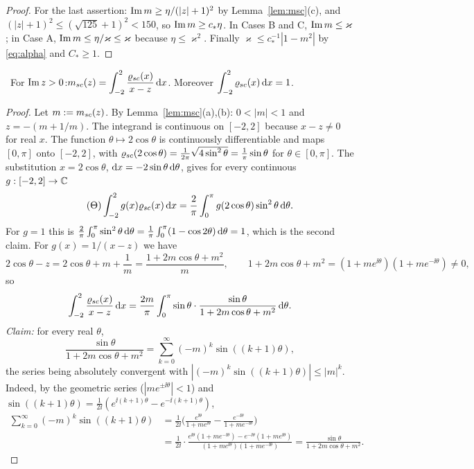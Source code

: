 \begin{proof}
For the last assertion: $\operatorname{Im} m\ge\eta/(|z|+1)^2$ by Lemma~\ref{lem:msc}(c), and $(|z|+1)^2\le(\sqrt{125}+1)^2<150$, so $\operatorname{Im} m\ge c_*\eta$. In Cases B and C, $\operatorname{Im} m\le\varkappa$; in Case A, $\operatorname{Im} m\le\eta/\varkappa\le\varkappa$ because $\eta\le\varkappa^2$.
Finally $\varkappa\le c_*^{-1}|1-m^2|$ by \eqref{eq:alpha} and $C_*\ge1$.
\end{proof}

\begin{lemma}\label{lem:stieltjes} \infra\
For $\operatorname{Im} z>0$:\quad $\displaystyle m_{sc}(z)=\int_{-2}^2\frac{\varrho_{sc}(x)}{x-z}\,\mathrm{d} x$. Moreover $\displaystyle\int_{-2}^2\varrho_{sc}(x)\,\mathrm{d} x=1$.
\end{lemma}
\begin{proof}
Let $m:=m_{sc}(z)$. By Lemma~\ref{lem:msc}(a),(b): $0<|m|<1$ and $z=-(m+1/m)$. The integrand is continuous on $[-2,2]$ because $x-z\ne0$ for real $x$.
The function $\theta\mapsto2\cos\theta$ is continuously differentiable and maps $[0,\pi]$ onto $[-2,2]$, with $\varrho_{sc}(2\cos\theta)=\frac1{2\pi}\sqrt{4\sin^2\theta}=\frac1\pi\sin\theta$ for $\theta\in[0,\pi]$.
The substitution $x=2\cos\theta$, $\mathrm{d} x=-2\sin\theta\,\mathrm{d}\theta$, gives for every continuous $g:[-2,2]\to\mathbb{C}$
\begin{equation}\tag{$\Theta$}\label{eq:a1-Theta}
 \int_{-2}^2g(x)\varrho_{sc}(x)\,\mathrm{d} x=\frac2\pi\int_0^\pi g(2\cos\theta)\sin^2\theta\,\mathrm{d}\theta .
\end{equation}
For $g=1$ this is $\frac2\pi\int_0^\pi\sin^2\theta\,\mathrm{d}\theta=\frac1\pi\int_0^\pi(1-\cos2\theta)\,\mathrm{d}\theta=1$, which is the second claim. For $g(x)=1/(x-z)$ we have
\[
 2\cos\theta-z=2\cos\theta+m+\frac1m=\frac{1+2m\cos\theta+m^2}{m},\qquad 1+2m\cos\theta+m^2=(1+me^{\ii\theta})(1+me^{-\ii\theta})\ne0,
\]
so
\[
 \int_{-2}^2\frac{\varrho_{sc}(x)}{x-z}\,\mathrm{d} x=\frac{2m}{\pi}\int_0^\pi\sin\theta\cdot\frac{\sin\theta}{1+2m\cos\theta+m^2}\,\mathrm{d}\theta .
\]
\emph{Claim:} for every real $\theta$,
\[
 \frac{\sin\theta}{1+2m\cos\theta+m^2}=\sum_{k=0}^\infty(-m)^k\sin((k+1)\theta),
\]
the series being absolutely convergent with $|(-m)^k\sin((k+1)\theta)|\le|m|^k$. Indeed, by the geometric series ($|me^{\pm\ii\theta}|<1$) and $\sin((k+1)\theta)=\frac1{2\ii}(e^{\ii(k+1)\theta}-e^{-\ii(k+1)\theta})$,
\begin{align*}
 \sum_{k=0}^\infty(-m)^k\sin((k+1)\theta)&=\frac1{2\ii}\Big(\frac{e^{\ii\theta}}{1+me^{\ii\theta}}-\frac{e^{-\ii\theta}}{1+me^{-\ii\theta}}\Big)\\
 &=\frac1{2\ii}\cdot\frac{e^{\ii\theta}(1+me^{-\ii\theta})-e^{-\ii\theta}(1+me^{\ii\theta})}{(1+me^{\ii\theta})(1+me^{-\ii\theta})}=\frac{\sin\theta}{1+2m\cos\theta+m^2}.

\end{align*}
\end{proof}
